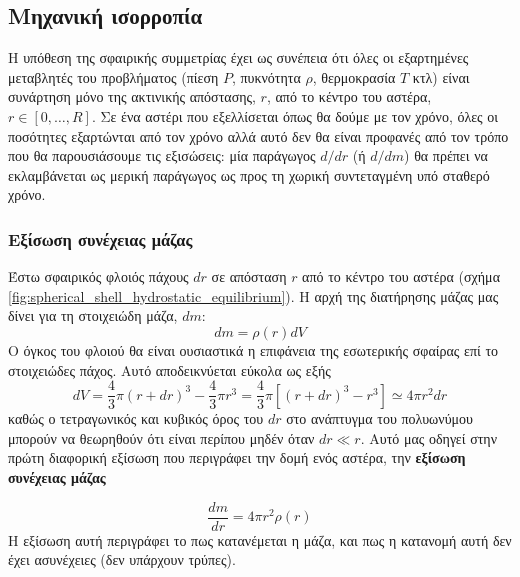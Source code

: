 \subsection{Μηχανική ισορροπία}
Η υπόθεση της σφαιρικής συμμετρίας έχει ως συνέπεια ότι όλες οι εξαρτημένες μεταβλητές του προβλήματος (πίεση $P$, πυκνότητα $\rho$, θερμοκρασία $T$ κτλ) είναι συνάρτηση μόνο της ακτινικής απόστασης, $r$, από το κέντρο του αστέρα, $r \in [0, \dots, R]$. Σε ένα αστέρι που εξελλίσεται όπως θα δούμε με τον χρόνο, όλες οι ποσότητες εξαρτώνται από τον χρόνο αλλά αυτό δεν θα είναι προφανές από τον τρόπο που θα παρουσιάσουμε τις εξισώσεις: μία παράγωγος $d/dr$ (ή $d/dm$) θα πρέπει να εκλαμβάνεται ως μερική παράγωγος ως προς τη χωρική συντεταγμένη υπό σταθερό χρόνο.
\subsubsection{Εξίσωση συνέχειας μάζας}
Έστω σφαιρικός φλοιός πάχους $dr$ σε απόσταση $r$ από το κέντρο του αστέρα (σχήμα \ref{fig:spherical_shell_hydrostatic_equilibrium}). Η αρχή της διατήρησης μάζας μας δίνει για τη στοιχειώδη μάζα, $dm$:
$$dm = \rho(r) dV$$
Ο όγκος του φλοιού θα είναι ουσιαστικά η επιφάνεια της εσωτερικής σφαίρας επί το στοιχειώδες πάχος. Αυτό αποδεικνύεται εύκολα ως εξής
$$dV = \frac{4}{3} \pi (r+dr)^3 - \frac{4}{3} \pi r^3 = \frac{4}{3} \pi \left[ (r+dr)^3 - r^3 \right] \simeq 4\pi r^2 dr$$ καθώς ο τετραγωνικός και κυβικός όρος του $dr$ στο ανάπτυγμα του πολυωνύμου μπορούν να θεωρηθούν ότι είναι περίπου μηδέν όταν $dr \ll r$. Αυτό μας οδηγεί στην πρώτη διαφορική εξίσωση που περιγράφει την δομή ενός αστέρα, την \textbf{εξίσωση συνέχειας μάζας}

\begin{equation}
    \label{eq:mass_continuity_diff}
    \boxed{\frac{dm}{dr} = 4 \pi r^2 \rho(r)} 
\end{equation}
Η εξίσωση αυτή περιγράφει το πως κατανέμεται η μάζα, και πως η κατανομή αυτή δεν έχει ασυνέχειες (δεν υπάρχουν τρύπες).


